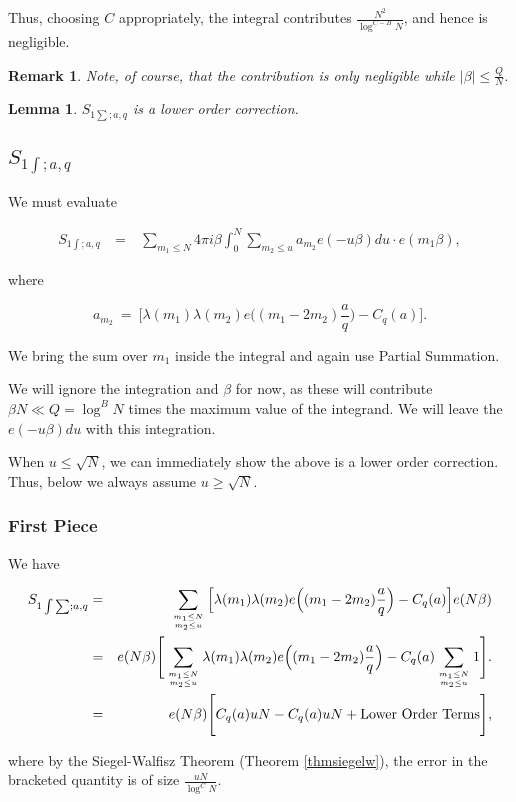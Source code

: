 \documentclass[12pt,letterpaper]{report}
\newcommand\be{\begin{equation}}
\newcommand\ee{\end{equation}}
\newcommand\bea{\begin{eqnarray}}
\newcommand\eea{\end{eqnarray}}
\newtheorem{lem}[thm]{Lemma}
\newtheorem{rek}[thm]{Remark}
\newcommand{\gl}{\lambda}
\begin{document}
Thus, choosing $C$ appropriately, the integral contributes
$\frac{N^2}{\log^{C-B} N}$, and hence is negligible.


\begin{rek} Note, of course, that the contribution is only
negligible while $|\beta| \le \frac{Q}{N}$.
\end{rek}


\begin{lem} $S_{1\sum;a,q}$ is a lower order correction. \end{lem}


\subsection{$S_{1\int;a,q}$}

We must evaluate

\bea S_{1\int;a,q} & \ = \ & \sum_{m_1 \le N} 4 \pi i \beta
\int_0^N \sum_{m_2 \le u} a_{m_2} e(-u\beta) du \cdot e(m_1
\beta), \eea

where

\be a_{m_2} \ = \ \Big[ \gl(m_1)\gl(m_2)e\Big( (m_1 -
2m_2)\frac{a}{q}\Big)  - C_q(a) \Big]. \ee

We bring the sum over $m_1$ inside the integral and again use
Partial Summation.

We will ignore the integration and $\beta$ for now, as these will
contribute $\beta N \ll Q = \log^B N$ times the maximum value of
the integrand. We will leave the $e(-u\beta) du$ with this
integration.

When $u \le \sqrt{N}$, we can immediately show the above is a
lower order correction. Thus, below we always assume $u \ge
\sqrt{N}$.


\subsubsection{First Piece}

We have

\bea S_{1\int\sum;a,q} &=& \sum_{m_1 \le N \atop m_2\le u} \Big[
\gl(m_1)\gl(m_2)e\Big( (m_1 - 2m_2)\frac{a}{q}\Big)  - C_q(a)
\Big] e(N\beta) \nonumber\\ &=& e(N\beta) \Bigg[ \sum_{m_1 \le N
\atop m_2\le u} \gl(m_1)\gl(m_2)e\Big( (m_1 -
2m_2)\frac{a}{q}\Big) - C_q(a) \sum_{m_1 \le N \atop m_2\le u} 1
\Bigg]. \nonumber\\ & = &  e(N\beta) \Bigg[ C_q(a) uN - C_q(a)uN +
\text{Lower Order Terms} \Bigg], \eea

where by the Siegel-Walfisz Theorem (Theorem \ref{thmsiegelw}),
the error in the bracketed quantity is of size $\frac{uN}{\log^C
N}$.
\end{document}
